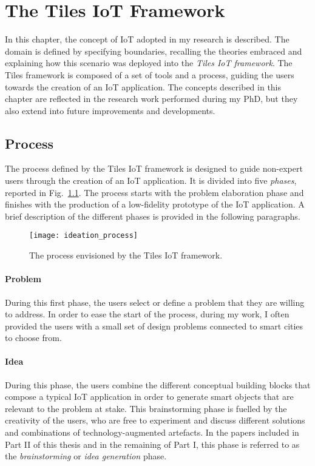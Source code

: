 \chapter{The Tiles IoT Framework}
\label{cha:iot-framework}

In this chapter, the concept of IoT adopted in my research is described. The domain is defined by specifying boundaries, recalling the theories embraced and explaining how this scenario was deployed into the \textit{Tiles IoT framework}. The Tiles framework is composed of a set of tools and a process, guiding the users towards the creation of an IoT application. The concepts described in this chapter are reflected in the research work performed during my PhD, but they also extend into future improvements and developments.


\section{Process}
\label{sec:iot-ideation-process}

The process defined by the Tiles IoT framework is designed to guide non-expert users through the creation of an IoT application. It is divided into five \textit{phases}, reported in Fig.~\ref{fig:ideation-process}. The process starts with the problem elaboration phase and finishes with the production of a low-fidelity prototype of the IoT application.
A brief description of the different phases is provided in the following paragraphs.

\begin{figure}[ptb]
    \centering 
	\texttt{[image: ideation\_process]}
	\caption{The process envisioned by the Tiles IoT framework.}
	\label{fig:ideation-process}
\end{figure}

\subsubsection{Problem}
During this first phase, the users select or define a problem that they are willing to address. In order to ease the start of the process, during my work, I often provided the users with a small set of design problems connected to smart cities to choose from.

\subsubsection{Idea}
During this phase, the users combine the different conceptual building blocks that compose a typical IoT application in order to generate smart objects that are relevant to the problem at stake. This brainstorming phase is fuelled by the creativity of the users, who are free to experiment and discuss different solutions and combinations of technology-augmented artefacts. In the papers included in Part II of this thesis and in the remaining of Part I, this phase is referred to as the \textit{brainstorming} or \textit{idea generation} phase.

